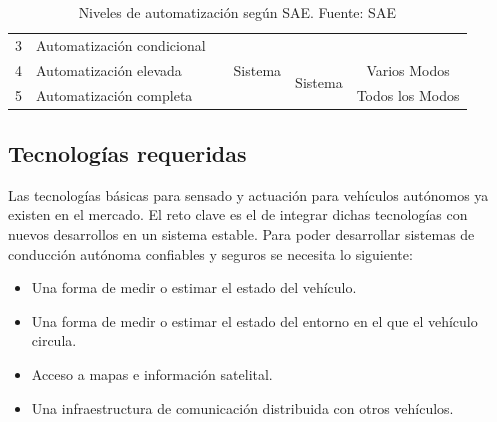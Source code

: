 \begin{table}[!h]
{\begin{tabular}{@{}|c|l|c|c|c|c|@{}}
            3                  & Automatización condicional &                                                                                          & \multirow{3}{*}{Sistema}                                                  &                                                                                          &                                                                         \\ \cmidrule(r){1-2} \cmidrule(l){5-6} 
            4                  & Automatización elevada     &                                                                                          &                                                                           & \multirow{2}{*}{Sistema}                                                                 & Varios Modos                                                            \\ \cmidrule(r){1-2} \cmidrule(l){6-6} 
            5                  & Automatización completa    &                                                                                          &                                                                           &                                                                                          & Todos los Modos                                                         \\ \bottomrule
            \end{tabular}%
            }
            \caption{Niveles de automatización según SAE. Fuente: SAE} %
            \label{tbl:niveles}
            \end{table}

    
    \subsection{Tecnologías requeridas}
    Las tecnologías básicas para sensado y actuación para vehículos autónomos ya existen en el mercado. El reto clave es el 
    de integrar dichas tecnologías con nuevos desarrollos en un sistema estable. Para poder desarrollar sistemas de conducción 
    autónoma confiables y seguros se necesita lo siguiente:

    \begin{itemize}
        \item Una forma de medir o estimar el estado del vehículo.
        \item Una forma de medir o estimar el estado del entorno en el que el vehículo circula.
        \item Acceso a mapas e información satelital.
        \item Una infraestructura de comunicación distribuida con otros vehículos.
    \end{itemize}


